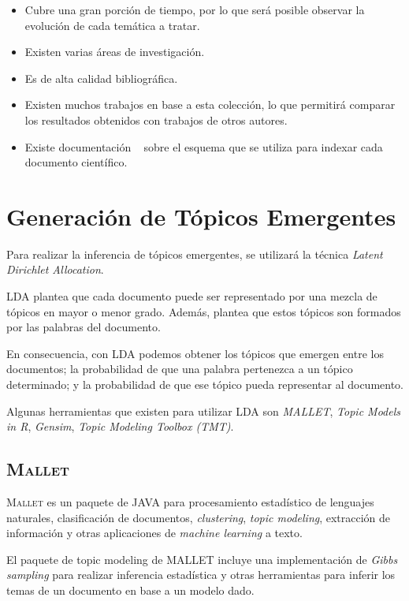 \documentclass[12pt,oneside,letterpaper]{book}
\newcommand{\eng}[1]{\textit{#1}\xspace}			%
\newcommand{\abr}[1]{\textsc{#1}\xspace}           %
\theoremstyle{definition}
\begin{document}
\begin{itemize}
	\item Cubre una gran porción de tiempo, por lo que será posible observar la evolución de cada temática a tratar.
	\item Existen varias áreas de investigación.
	\item Es de alta calidad bibliográfica.
	\item Existen muchos trabajos en base a esta colección, lo que permitirá comparar los resultados obtenidos con trabajos de otros autores.
	\item Existe documentación ~\cite{ley2009dblp} sobre el esquema que se utiliza para indexar cada documento científico.
\end{itemize}

\section{Generación de Tópicos Emergentes}
\label{sec:generacion_de_topicos_emergentes}
Para realizar la inferencia de tópicos emergentes, se utilizará la técnica \eng{Latent Dirichlet Allocation}.

\abr{LDA} plantea que cada documento puede ser representado por una mezcla de tópicos en mayor o menor grado. Además, plantea que estos tópicos son formados por las palabras del documento.

En consecuencia, con \abr{LDA} podemos obtener los tópicos que emergen entre los documentos; la probabilidad de que una palabra pertenezca a un tópico determinado; y la probabilidad de que ese tópico pueda representar al documento.

Algunas herramientas que existen para utilizar \abr{LDA} son \eng{MALLET}, \eng{Topic Models in R}, \eng{Gensim}, \eng{Topic Modeling Toolbox (\abr{TMT})}.

\subsection{\abr{Mallet}}
 \label{sub:mallet}
\abr{Mallet} es un paquete de JAVA para procesamiento estadístico de lenguajes naturales, clasificación de documentos, \eng{clustering}, \eng{topic modeling}, extracción de información y otras aplicaciones de \eng{machine learning} a texto.

El paquete de topic modeling de MALLET incluye una implementación de \eng{Gibbs sampling} para realizar inferencia estadística y otras herramientas para inferir los temas de un documento en base a un modelo dado.
\end{document}
